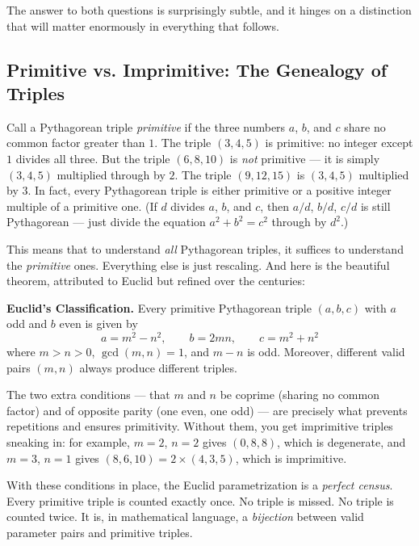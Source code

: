 The answer to both questions is surprisingly subtle, and it hinges on a distinction that will matter enormously in everything that follows.

\bigskip

\subsection*{Primitive vs. Imprimitive: The Genealogy of Triples}

Call a Pythagorean triple \textit{primitive} if the three numbers $a$, $b$, and $c$ share no common factor greater than $1$. The triple $(3, 4, 5)$ is primitive: no integer except $1$ divides all three. But the triple $(6, 8, 10)$ is \textit{not} primitive --- it is simply $(3, 4, 5)$ multiplied through by $2$. The triple $(9, 12, 15)$ is $(3, 4, 5)$ multiplied by $3$. In fact, every Pythagorean triple is either primitive or a positive integer multiple of a primitive one. (If $d$ divides $a$, $b$, and $c$, then $a/d$, $b/d$, $c/d$ is still Pythagorean --- just divide the equation $a^2 + b^2 = c^2$ through by $d^2$.)

This means that to understand \textit{all} Pythagorean triples, it suffices to understand the \textit{primitive} ones. Everything else is just rescaling. And here is the beautiful theorem, attributed to Euclid but refined over the centuries:


\begin{displayquote}
\textbf{Euclid's Classification.} Every primitive Pythagorean triple $(a, b, c)$ with $a$ odd and $b$ even is given by
$$a = m^2 - n^2, \qquad b = 2mn, \qquad c = m^2 + n^2$$
where $m > n > 0$, $\gcd(m, n) = 1$, and $m - n$ is odd. Moreover, different valid pairs $(m, n)$ always produce different triples.
\end{displayquote}


The two extra conditions --- that $m$ and $n$ be coprime (sharing no common factor) and of opposite parity (one even, one odd) --- are precisely what prevents repetitions and ensures primitivity. Without them, you get imprimitive triples sneaking in: for example, $m = 2$, $n = 2$ gives $(0, 8, 8)$, which is degenerate, and $m = 3$, $n = 1$ gives $(8, 6, 10) = 2 \times (4, 3, 5)$, which is imprimitive.

With these conditions in place, the Euclid parametrization is a \textit{perfect census}. Every primitive triple is counted exactly once. No triple is missed. No triple is counted twice. It is, in mathematical language, a \textit{bijection} between valid parameter pairs and primitive triples.


